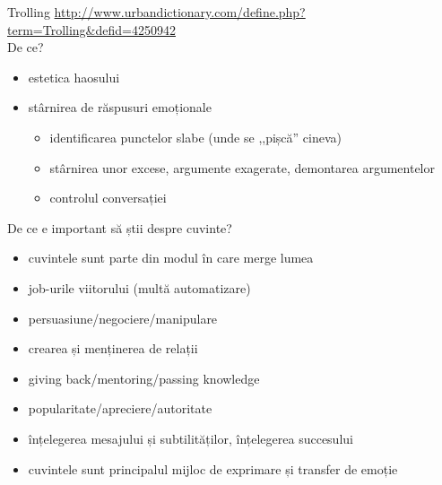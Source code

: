 \documentclass{beamer}
\begin{document}
\begin{frame}{Trolling}
  \centering
  \scriptsize
  \pause
  \url{http://www.urbandictionary.com/define.php?term=Trolling&defid=4250942}\\
  \vspace{5mm}
  \normalsize
  \pause
  De ce?
  \vspace{2mm}
  \begin{itemize}
    \pause
    \item estetica haosului
    \pause
    \item stârnirea de răspusuri emoționale
      \begin{itemize}
        \pause
        \item identificarea punctelor slabe (unde se ,,pișcă'' cineva)
        \pause
        \item stârnirea unor excese, argumente exagerate, demontarea argumentelor
        \pause
        \item controlul conversației
      \end{itemize}
  \end{itemize}
\end{frame}

\begin{frame}{De ce e important să știi despre cuvinte?}
  \begin{itemize}
    \pause
    \item cuvintele sunt parte din modul în care merge lumea
    \pause
    \item job-urile viitorului (multă automatizare)
    \pause
    \item persuasiune/negociere/manipulare
    \pause
    \item crearea și menținerea de relații
    \pause
    \item giving back/mentoring/passing knowledge
    \pause
    \item popularitate/apreciere/autoritate
    \pause
    \item înțelegerea mesajului și subtilităților, înțelegerea succesului
    \pause
    \item cuvintele sunt principalul mijloc de exprimare și transfer de emoție
  \end{itemize}
\end{frame}
\end{document}
